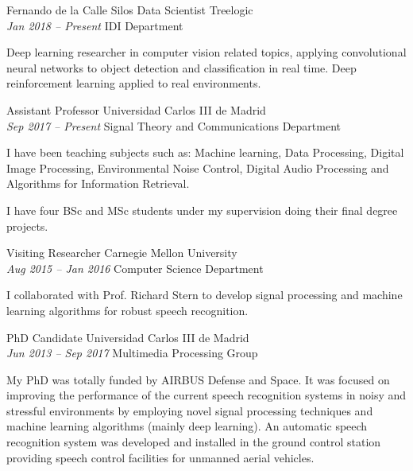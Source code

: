 \documentclass[10pt]{scrartcl}
\begin{document}
\begin{cv}{\spacedallcaps Fernando de la Calle Silos}
{\color{Maroon} Data Scientist} \hfill  Treelogic\\
\textit{Jan 2018 -- Present}  \hfill IDI Department\vspace{0.5em}

Deep learning researcher in computer vision related topics, applying convolutional neural networks to object detection and classification in real time. Deep reinforcement learning applied to real environments. 
\vspace{1em}

{\color{Maroon} Assistant Professor} \hfill  Universidad Carlos III de Madrid\\
\textit{Sep 2017 -- Present}   \hfill Signal Theory and Communications Department\vspace{0.5em}

I have been teaching subjects such as: Machine learning, Data Processing, Digital Image Processing, Environmental Noise Control, Digital Audio Processing and Algorithms for Information Retrieval.

I have four BSc and MSc students under my supervision doing their final degree projects.
\vspace{1em}


{\color{Maroon} Visiting Researcher} \hfill  Carnegie Mellon University\\
\textit{Aug 2015 -- Jan 2016}  \hfill Computer Science Department\vspace{0.5em}

I collaborated with Prof. Richard Stern to develop signal processing and machine learning algorithms for robust speech recognition.
\vspace{1em}

{\color{Maroon} PhD  Candidate}  \hfill  Universidad Carlos III de Madrid\\
\textit{Jun 2013 -- Sep 2017}  \hfill  Multimedia Processing Group\vspace{0.5em}

My PhD was totally funded by AIRBUS Defense and Space.  
It was focused on improving the performance of the current  speech recognition systems in noisy and stressful environments by employing novel signal processing techniques and machine learning algorithms (mainly deep learning).
An automatic speech recognition system was developed and installed in the ground control station providing speech control facilities for unmanned aerial vehicles.



\vspace{1em}


\end{cv}
\end{document}
